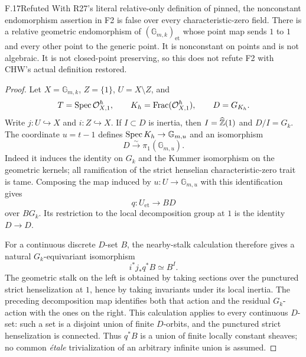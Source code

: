 \begin{claim}{F.17}{Refuted}
With R27's literal relative-only definition of pinned, the
nonconstant endomorphism assertion in F2 is false over every
characteristic-zero field. There is a relative geometric endomorphism
of $(\mathbb G_{m,k})_{\mathrm{et}}$ whose point map sends $1$ to
$1$ and every other point to the generic point. It is nonconstant
on points and is not algebraic. It is not closed-point preserving,
so this does not refute F2 with CHW's actual definition restored.
\end{claim}
\begin{proof}
Let $X=\mathbb G_{m,k}$, $Z=\{1\}$, $U=X\setminus Z$, and
\[
 T=\operatorname{Spec}\mathcal O^h_{X,1},\qquad K_h=\operatorname{Frac}
       (\mathcal O^h_{X,1}),\qquad D=G_{K_h}.
\]
Write $j:U\hookrightarrow X$ and $i:Z\hookrightarrow X$.
If $I\subset D$ is inertia, then $I=\widehat{\mathbb Z}(1)$ and
$D/I=G_k$. The coordinate $u=t-1$ defines
$\operatorname{Spec} K_h\to\mathbb G_{m,u}$ and an isomorphism
\[
 D\xrightarrow{\sim}\pi_1(\mathbb G_{m,u}).
\]
Indeed it induces the identity on $G_k$ and the Kummer
isomorphism on the geometric kernels; all ramification of the
strict henselian characteristic-zero trait is tame. Composing the
map induced by $u:U\to\mathbb G_{m,u}$ with this identification
gives
\[
 q:U_{\mathrm{et}}\longrightarrow BD
\]
over $BG_k$. Its restriction to the local decomposition group at
$1$ is the identity $D\to D$.

For a continuous discrete $D$-set $B$, the nearby-stalk calculation
therefore gives a natural $G_k$-equivariant isomorphism
\begin{equation}\label{eq:F17:nearby}
 i^*j_*q^*B\simeq B^I.
\end{equation}
The geometric stalk on the left is obtained by taking sections
over the punctured strict henselization at $1$, hence by taking
invariants under its local inertia. The preceding decomposition
map identifies both that action and the residual $G_k$-action
with the ones on the right. This calculation applies to every
continuous $D$-set: such a set is a disjoint union of finite
$D$-orbits, and the punctured strict henselization is connected.
Thus $q^*B$ is a union of finite locally constant sheaves; no
common \emph{\'etale} trivialization of an arbitrary infinite
union is assumed.


\end{proof}
